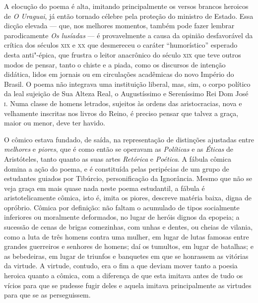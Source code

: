 A elocução do poema é alta, imitando principalmente os versos brancos heroicos
de \textit{O Uraguai}, já então tornado célebre pela proteção do ministro de
Estado.  Essa dicção elevada --- que, nos melhores momentos, também pode fazer
lembrar parodicamente \textit{Os lusíadas} --- é provavelmente a causa da opinião
desfavorável da crítica dos séculos \textsc{xix} e \textsc{xx} que desmereceu o
caráter ``humorístico'' esperado desta anti"-épica, que frustra o leitor
anacrônico do século \textsc{xix} que teve outros modos de pensar, tanto o
chiste e a piada, como os discursos de intenção didática, lidos em jornais ou em
circulações acadêmicas do novo Império do Brasil.  O poema não integrava uma
instituição liberal, mas, sim, o corpo político da leal sujeição de Sua Alteza
Real, o Augustíssimo e Sereníssimo Rei Dom José \textsc{i}.  Numa classe de
homens letrados, sujeitos às ordens das aristocracias, nova e velhamente
inscritas nos livros do Reino, é preciso pensar que talvez a graça, maior ou
menor, deve ter havido.

O cômico estava fundado, de saída, na representação de distinções ajustadas
entre \textit{melhores} e \textit{piores}, que é como então se operavam as
\textit{Políticas} e as \textit{Éticas} de Aristóteles, tanto quanto as suas
artes \textit{Retórica} e \textit{Poética}.  A fábula cômica domina a ação do
poema, e é constituída pelas peripécias de um grupo de estudantes guiados por
Tibúrcio, personificação da Ignorância.  Mesmo que não se veja graça em mais
quase nada neste poema estudantil, a fábula é aristotelicamente cômica, isto é,
imita os piores, descreve matéria baixa, digna de opróbrio. Cômica por
definição: não faltam o acumulado de tipos socialmente inferiores ou moralmente
deformados, no lugar de heróis dignos da epopeia; a sucessão de cenas de brigas
comezinhas, com unhas e dentes, ou cheias de vilania, como a luta de três homens
contra uma mulher, em lugar de lutas famosas entre grandes guerreiros e senhores
de homens; daí os tumultos, em lugar de batalhas; e as bebedeiras, em lugar de
triunfos e banquetes em que se honrassem as vitórias da virtude.  A virtude,
contudo, era o fim a que deviam mover tanto a poesia heroica quanto a cômica,
com a diferença de que esta imitava antes de tudo os vícios para que se pudesse
fugir deles e aquela imitava principalmente as virtudes para que se as
perseguissem.

